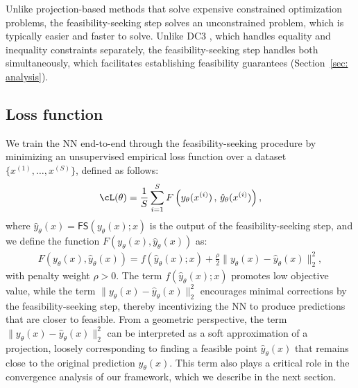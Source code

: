 \documentclass{article}
\def\FS{\mathsf{FS}}
\def\x{x}
\def\y{y_{\theta}}   \def\hy{\hat{y}_{\theta}}    \def\ty{\Tilde{y}}
\def\i{{(i)}}
\begin{document}
Unlike projection-based methods that solve expensive constrained optimization problems, the feasibility-seeking step solves an unconstrained problem, which is typically easier and faster to solve. %
Unlike DC3 \cite{donti2021dc3}, which handles equality and inequality constraints separately, the feasibility-seeking step handles both simultaneously, which facilitates establishing feasibility guarantees (Section~\ref{sec: analysis}). 

\subsection{Loss function}\label{sec: loss}
We train the NN end-to-end through the feasibility-seeking procedure by minimizing an unsupervised empirical loss function over a dataset $\{x^{(1)}, \dots, x^{(S)}\}$, defined as follows:
\begin{align}\label{eq: empirical loss}
    \cL(\theta) = \frac{1}{S} \sum_{i=1}^S F \left(\y(\x^{(i)}) \, , \, \hy(\x^\i)\right),
\end{align}
where $\hy(\x) = \FS(\y(\x); \x)$ is the output of the feasibility-seeking step, and we define the function $F(\y(\x) , \hy(\x))$ as:
\begin{align}\label{eq: F}
    F(\y(\x) , \hy(\x)) = f(\hy(\x);\x) + \frac{\rho}{2} \|\y(\x)- \hy(\x)\|_2^2, %
\end{align}
with penalty weight $\rho > 0$. %
The term $f(\hy(\x); \x)$ promotes low objective value, while the term $\| \y(\x)- \hy(\x)\|_2^2$ encourages minimal corrections by the feasibility-seeking step, thereby incentivizing the NN to produce predictions that are closer to feasible.
From a geometric perspective, the term $\|\y(\x) - \hy(\x)\|_2^2 $ can be interpreted as a soft approximation of a projection, loosely corresponding to finding a feasible point $\hy(\x)$ that remains close to the original prediction $\y(\x)$. %
This term also plays a critical role in the convergence analysis of our framework, which we describe in the next section.
\end{document}
